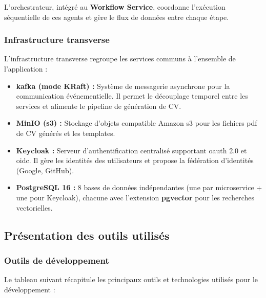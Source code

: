 L'orchestrateur, intégré au \textbf{Workflow Service}, coordonne l'exécution séquentielle de ces agents et gère le flux de données entre chaque étape.

\subsubsection{Infrastructure transverse}
\label{subsubsec:realisation:archi-infra}

L'infrastructure transverse regroupe les services communs à l'ensemble de l'application :

\begin{itemize}
    \item \textbf{\gls{kafka} (mode KRaft) :} Système de messagerie asynchrone pour la communication événementielle. Il permet le découplage temporel entre les services et alimente le pipeline de génération de CV.
    \item \textbf{MinIO (\gls{s3}) :} Stockage d'objets compatible Amazon \gls{s3} pour les fichiers \gls{pdf} de CV générés et les templates.
    \item \textbf{Keycloak :} Serveur d'authentification centralisé supportant \gls{oauth} 2.0 et \gls{oidc}. Il gère les identités des utilisateurs et propose la fédération d'identités (Google, GitHub).
    \item \textbf{PostgreSQL 16 :} 8 bases de données indépendantes (une par microservice + une pour Keycloak), chacune avec l'extension \textbf{pgvector} pour les recherches vectorielles.
\end{itemize}

\subsection{Présentation des outils utilisés}
\label{subsec:realisation:outils}

\subsubsection{Outils de développement}
\label{subsubsec:realisation:outils-dev}

Le tableau suivant récapitule les principaux outils et technologies utilisés pour le développement :

